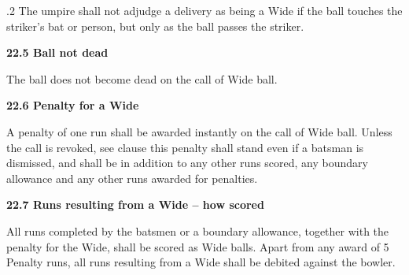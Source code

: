\documentclass[12pt]{article}
\begin{document}
\vspace{\baselineskip}
\begin{adjustwidth}{0.5in}{0.19in}
{\fontsize{9pt}{10.8pt}.2 \tabto{0.49in} The umpire shall not adjudge a delivery as being a Wide if the ball touches the striker’s bat or person, but only as the ball passes the striker.\par}\par

\end{adjustwidth}


\vspace{\baselineskip}
{\fontsize{11pt}{13.2pt}\selectfont \textbf{22.5 \tabto{0.47in} Ball not dead}\par}\par


\vspace{\baselineskip}
{\fontsize{9pt}{10.8pt}\selectfont The ball does not become dead on the call of Wide ball.\par}\par


\vspace{\baselineskip}
{\fontsize{11pt}{13.2pt}\selectfont \textbf{22.6 \tabto{0.47in} Penalty for a Wide}\par}\par


\vspace{\baselineskip}
\begin{adjustwidth}{0.0in}{0.15in}
{\fontsize{9pt}{10.8pt}\selectfont A penalty of one run shall be awarded instantly on the call of Wide ball. Unless the call is revoked, see clause  this penalty shall stand even if a batsman is dismissed, and shall be in addition to any other runs scored, any boundary allowance and any other runs awarded for penalties.\par}\par

\end{adjustwidth}


\vspace{\baselineskip}
{\fontsize{11pt}{13.2pt}\selectfont \textbf{22.7 \tabto{0.47in} Runs resulting from a Wide – how scored}\par}\par


\vspace{\baselineskip}
\begin{adjustwidth}{0.0in}{0.14in}
{\fontsize{9pt}{10.8pt}\selectfont All runs completed by the batsmen or a boundary allowance, together with the penalty for the Wide, shall be scored as Wide balls. Apart from any award of 5 Penalty runs, all runs resulting from a Wide shall be debited against the bowler.\par}\par

\end{adjustwidth}
\end{document}
